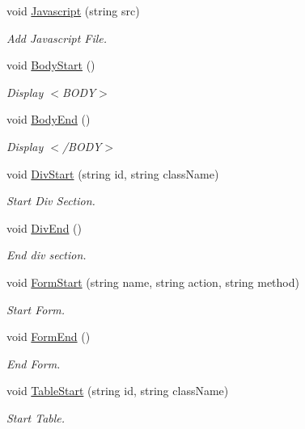 \begin{DoxyCompactItemize}
void \hyperlink{classHTMLTags_aea041d720f12a210615c95350774e6aa}{Javascript} (string src)
\begin{DoxyCompactList}\small\item\em Add Javascript File. \end{DoxyCompactList}\item 
void \hyperlink{classHTMLTags_af1fb7b90b9ebb83177da18aba1ef86a9}{Body\-Start} ()
\begin{DoxyCompactList}\small\item\em Display $<$\-B\-O\-D\-Y$>$ \end{DoxyCompactList}\item 
void \hyperlink{classHTMLTags_a7cae36bd3a0e6f35e89494e5cda64971}{Body\-End} ()
\begin{DoxyCompactList}\small\item\em Display $<$/\-B\-O\-D\-Y$>$ \end{DoxyCompactList}\item 
void \hyperlink{classHTMLTags_a897512b202cfd12729e8fa24e67ea4d6}{Div\-Start} (string id, string class\-Name)
\begin{DoxyCompactList}\small\item\em Start Div Section. \end{DoxyCompactList}\item 
void \hyperlink{classHTMLTags_aa82b2d3d85b3afd29e5641dbe1ace439}{Div\-End} ()
\begin{DoxyCompactList}\small\item\em End div section. \end{DoxyCompactList}\item 
void \hyperlink{classHTMLTags_a1489ccf4629069eca5e550eeb8e8e887}{Form\-Start} (string name, string action, string method)
\begin{DoxyCompactList}\small\item\em Start Form. \end{DoxyCompactList}\item 
void \hyperlink{classHTMLTags_ab57baef28db9590ce59d0e2f403a210f}{Form\-End} ()
\begin{DoxyCompactList}\small\item\em End Form. \end{DoxyCompactList}\item 
void \hyperlink{classHTMLTags_a9d4bc37c7d615bc1d7f7c738dae48ad3}{Table\-Start} (string id, string class\-Name)
\begin{DoxyCompactList}\small\item\em Start Table. \end{DoxyCompactList}\item 

\end{DoxyCompactItemize}
